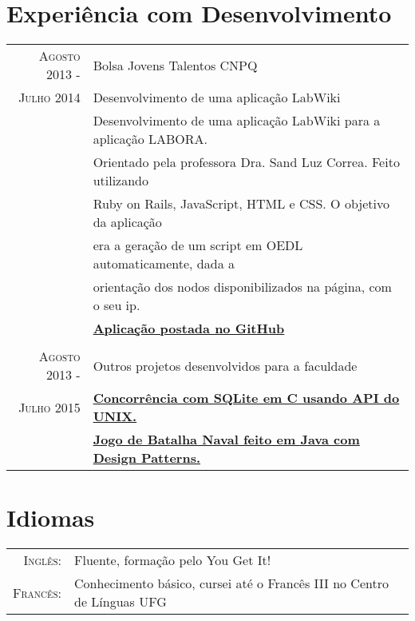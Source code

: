 \documentclass[a4paper,10pt]{article} %
\begin{document}
\section{Experiência com Desenvolvimento}

\begin{tabular}{rl}
	\textsc{Agosto} 2013 - & Bolsa Jovens Talentos CNPQ\\
	\textsc{Julho} 2014 & Desenvolvimento de uma aplicação LabWiki\\
	& Desenvolvimento de uma aplicação LabWiki para a aplicação LABORA. \\
	& Orientado pela professora Dra. Sand Luz Correa. Feito utilizando \\
	& Ruby on Rails, JavaScript, HTML e CSS. O objetivo da aplicação  \\
	& era a geração de um script em OEDL automaticamente, dada a \\
	& orientação dos nodos disponibilizados na página, com o seu ip. \\
	& \href{https://github.com/Yuri-M-Dias/LabWiki}{\bf Aplicação postada no GitHub} \\
	& \\
	\textsc{Agosto} 2013 - & Outros projetos desenvolvidos para a faculdade \\
	\textsc{Julho} 2015 &
	\href{https://bitbucket.org/Yuri-M-Dias/projeto-3/overview}
	{\bf Concorrência com SQLite em C usando API do UNIX.} \\
	& \href{https://github.com/Yuri-M-Dias/JavaBattleship}{\bf Jogo de Batalha Naval feito em Java com Design Patterns.}

\end{tabular}




\section{Idiomas}

\begin{tabular}{rl}
	\textsc{Inglês:} & Fluente, formação pelo You Get It!\\
	\textsc{Francês:} & Conhecimento básico, cursei até o Francês III no Centro de Línguas UFG\\
\end{tabular}
\end{document}
